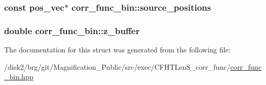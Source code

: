 \subsubsection[{source\+\_\+positions}]{\setlength{\rightskip}{0pt plus 5cm}const {\bf pos\+\_\+vec}$\ast$ corr\+\_\+func\+\_\+bin\+::source\+\_\+positions}\label{structcorr__func__bin_a6bf79ee0d0e960fb9d909869cd76ac04}
\hypertarget{structcorr__func__bin_a84d10388283c2977e9338534303e355b}{}
\subsubsection[{z\+\_\+buffer}]{\setlength{\rightskip}{0pt plus 5cm}double corr\+\_\+func\+\_\+bin\+::z\+\_\+buffer}\label{structcorr__func__bin_a84d10388283c2977e9338534303e355b}


The documentation for this struct was generated from the following file\+:\begin{DoxyCompactItemize}
\item 
/disk2/brg/git/\+Magnification\+\_\+\+Public/src/exec/\+C\+F\+H\+T\+Len\+S\+\_\+corr\+\_\+func/\hyperlink{corr__func__bin_8hpp}{corr\+\_\+func\+\_\+bin.\+hpp}\end{DoxyCompactItemize}

